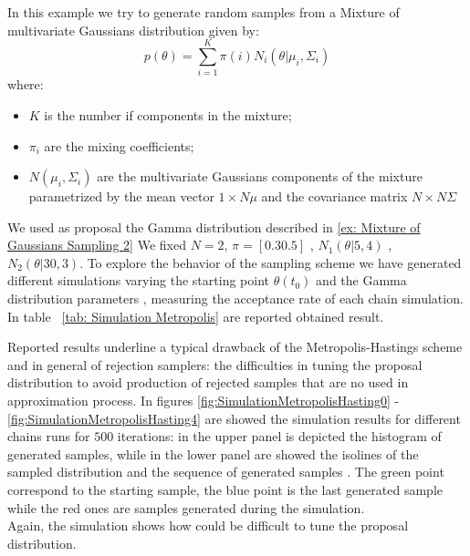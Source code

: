\begin{example} \label{ex: Mixture of Multivariate Gaussians Sampling}
In this example we try to generate random samples from a Mixture of multivariate Gaussians distribution given by:
$$
	p(\theta)=\sum_{i=1}^K \pi(i)N_i(\theta | \mu_i,\Sigma_i)
$$
where:
\begin{itemize}
\item $K$ is the number if components in the mixture;
\item $\pi_i$ are the mixing coefficients;
\item $N(\mu_i,\Sigma_i)$ are the multivariate Gaussians components of the mixture 
parametrized by the mean vector $1 \times N \mu$ and the covariance matrix
$N \times N \Sigma$
\end{itemize}
We used as proposal the Gamma distribution described in \ref{ex: Mixture of Gaussians Sampling 2}
We fixed $N=2$, $\pi=[0.3 0.5]$ , $N_1(\theta |5,4)$ , $N_2(\theta |30,3)$.
To explore the behavior of the sampling scheme we have generated different simulations varying the starting point $\theta(t_0)$ and the Gamma distribution parameters , measuring the acceptance rate of each chain simulation. In table ~\ref{tab: Simulation Metropolis} are reported obtained result.

Reported results underline a typical drawback of the Metropolis-Hastings scheme and in general of rejection samplers: the difficulties
in tuning the proposal distribution to avoid production of rejected samples that are no used in approximation process. 
In figures \ref{fig:SimulationMetropolisHasting0} - \ref{fig:SimulationMetropolisHasting4} are showed the simulation results for different chains runs for $500$ iterations:  in the upper panel is depicted the histogram of generated samples, while in the lower panel are showed the isolines of the sampled distribution and the sequence of generated samples . The green point correspond to the starting sample, the blue point is the last generated sample while the red ones are samples generated during the simulation.\\
Again, the simulation shows how could be difficult to tune the proposal distribution.




\end{example}
